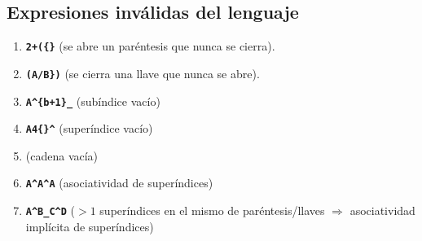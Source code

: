     \subsection{Expresiones inválidas del lenguaje}
        \begin{enumerate}
            \item
            \textbf{\texttt{2+(\{\}}} (se abre un paréntesis que nunca se cierra).

            \item
            \textbf{\texttt{(A/B\})}} (se cierra una llave que nunca se abre).

            \item
            \textbf{\texttt{A\^{}\{b+1\}\_{}}}  (subíndice vacío)

            \item
            \textbf{\texttt{A4\{\}\^{}}} (superíndice vacío)

            \item (cadena vacía)

            \item
            \textbf{\texttt{A\^{}A\^{}A}} (asociatividad de superíndices)

            \item
            \textbf{\texttt{A\^{}B\_{}C\^{}D}} ($>1$ superíndices en el mismo  de paréntesis/llaves $\Rightarrow$ asociatividad implícita de superíndices)
        \end{enumerate}
